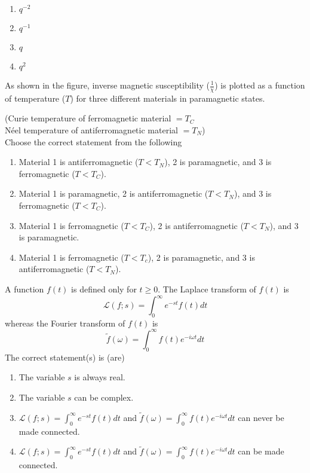 \begin{enumerate}
\item $q^{-2}$
\item $q^{-1}$
\item $q$
\item $q^2$
\end{enumerate}

\item As shown in the figure, inverse magnetic susceptibility ($\frac{1}{\chi}$) is plotted as a function of temperature ($T$) for three different materials in paramagnetic states.


(Curie temperature of ferromagnetic material $=T_C$ \\ N\'eel temperature of antiferromagnetic material $=T_N$) \\ Choose the correct statement from the following

\begin{enumerate}
\item Material 1 is antiferromagnetic ($T<T_N$), 2 is paramagnetic, and 3 is ferromagnetic ($T<T_C$).
\item Material 1 is paramagnetic, 2 is antiferromagnetic ($T<T_N$), and 3 is ferromagnetic ($T<T_C$).
\item Material 1 is ferromagnetic ($T<T_C$), 2 is antiferromagnetic ($T<T_N$), and 3 is paramagnetic.
\item Material 1 is ferromagnetic ($T<T_c$), 2 is paramagnetic, and 3 is antiferromagnetic ($T<T_N$).
\end{enumerate}

\item A function $f(t)$ is defined only for $t\geq0$. The Laplace transform of $f(t)$ is $$\mathcal{L}(f;s)=\int_0^\infty e^{-st}f(t) dt$$ whereas the Fourier transform of $f(t)$ is $$\tilde{f}(\omega)=\int_0^\infty f(t)e^{-i\omega t}dt$$ The correct statement(s) is (are)

\begin{enumerate}
\item The variable $s$ is always real.
\item The variable $s$ can be complex.
\item $\mathcal{L}(f;s)=\int_0^\infty e^{-st}f(t) dt$ and $\tilde{f}(\omega)=\int_0^\infty f(t)e^{-i\omega t}dt$ can never be made connected.
\item $\mathcal{L}(f;s)=\int_0^\infty e^{-st}f(t) dt$ and $\tilde{f}(\omega)=\int_0^\infty f(t)e^{-i\omega t}dt$ can be made connected.
\end{enumerate}
